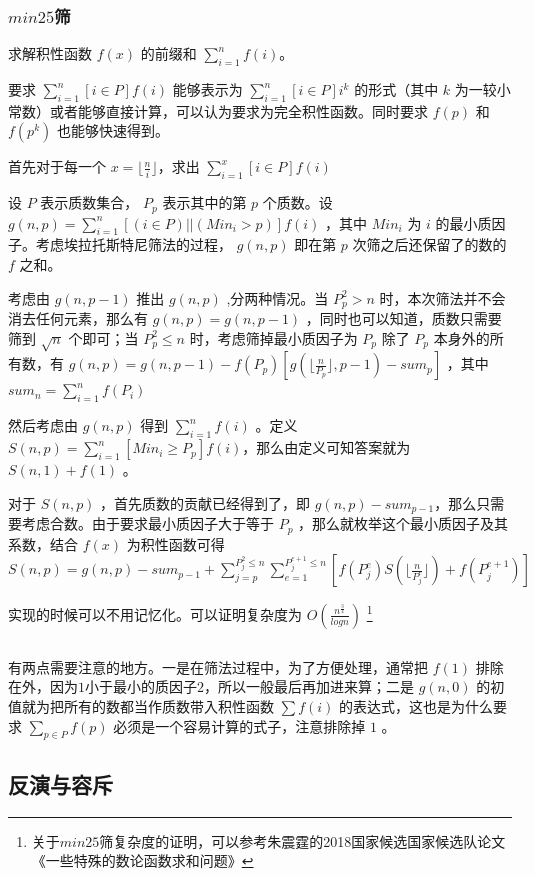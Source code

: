 \documentclass[UTF-8]{ctexart}
\newcommand{\cpp}[1]{\inputminted[bgcolor=bg,breaklines,breakanywhere=true]{c++}{#1}}
\begin{document}
			\subsubsection{$min25$筛}
			求解积性函数 $f(x)$ 的前缀和 $\sum _ {i=1} ^ n f(i)$。
			
			要求 $\sum _ {i=1}^n [i \in P]f(i)$ 能够表示为 $\sum _ {i=1}^ n[i \in P] i^k$ 的形式（其中 $k$ 为一较小常数）或者能够直接计算，可以认为要求为完全积性函数。同时要求 $f(p)$ 和 $f(p^k)$ 也能够快速得到。 
			
			首先对于每一个 $x=\lfloor \frac{n}{i} \rfloor $，求出 $\sum _ {i=1} ^ x [i \in P]f(i)$
			
			设 $P$ 表示质数集合， $P_p$ 表示其中的第 $p$ 个质数。设 $g(n,p)=\sum_{i=1}^n[(i \in P)||(Min_i>p)]f(i)$ ，其中 $Min_i$ 为 $i$ 的最小质因子。考虑埃拉托斯特尼筛法的过程， $g(n,p)$ 即在第 $p$ 次筛之后还保留了的数的 $f$ 之和。
			
			考虑由 $g(n,p-1)$ 推出 $g(n,p)$ ,分两种情况。当 $P_p^2>n$ 时，本次筛法并不会消去任何元素，那么有 $g(n,p)=g(n,p-1)$ ，同时也可以知道，质数只需要筛到 $\sqrt{n}$ 个即可；当 $P _ p ^ 2 \leq n$ 时，考虑筛掉最小质因子为 $P_p$ 除了 $P_p$ 本身外的所有数，有 $g(n,p)=g(n,p-1)-f(P_p)[g(\lfloor \frac{n}{P_p} \rfloor,p-1)-sum_p]$ ，其中 $sum_n=\sum_{i=1}^n f(P_i)$
			
			然后考虑由 $g(n,p)$ 得到 $\sum_{i=1}^n f(i)$ 。定义 $S(n,p)=\sum_{i=1}^n [Min_i \ge P_p]f(i)$，那么由定义可知答案就为 $S(n,1)+f(1)$ 。
			
			对于 $S(n,p)$ ，首先质数的贡献已经得到了，即 $g(n,p)-sum_{p-1}$，那么只需要考虑合数。由于要求最小质因子大于等于 $P_p$ ，那么就枚举这个最小质因子及其系数，结合 $f(x)$ 为积性函数可得 $S(n,p)=g(n,p)-sum_{p-1}+\sum_{j=p}^{P_j^2\le n}\sum_{e=1}^{P_j^{e+1}\le n}[f(P_j^e)S(\lfloor \frac{n}{P_j^e}\rfloor)+f(P_j^{e+1})]$ 
			
			实现的时候可以不用记忆化。可以证明复杂度为 $O(\frac{n^{\frac{3}{4}}}{logn})$ \footnote{关于$min25$筛复杂度的证明，可以参考朱震霆的2018国家候选国家候选队论文《一些特殊的数论函数求和问题》}
			
			\cpp{code//Math//min25.cpp}
	
			有两点需要注意的地方。一是在筛法过程中，为了方便处理，通常把 $f(1)$ 排除在外，因为$1$小于最小的质因子$2$，所以一般最后再加进来算；二是 $g(n,0)$ 的初值就为把所有的数都当作质数带入积性函数 $\sum f(i)$ 的表达式，这也是为什么要求 $\sum_{p \in P}f(p)$ 必须是一个容易计算的式子，注意排除掉 $1$ 。
		\subsection{反演与容斥}
\end{document}
